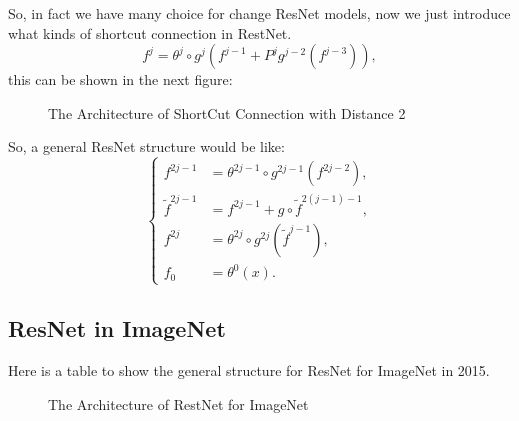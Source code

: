 So, in fact we have many choice for change ResNet models, now we just introduce what kinds of shortcut connection in  RestNet. 
\begin{equation}
f^j = \theta^j \circ g^j(f^{j-1} + P^jg^{j-2}(f^{j-3}) ),
\end{equation}
this can be shown in the next figure:
\begin{figure}[!htb]
	\caption{The Architecture of ShortCut Connection with Distance 2}      
	\label{LeNet-5}
\end{figure}
So, a general ResNet structure would be like:
\begin{equation}
\begin{cases}
f^{2j-1} &= \theta^{2j-1} \circ g^{2j-1}(f^{2j-2}), \\
\tilde f^{2j-1} &= f^{2j-1} + g\circ \tilde f^{2(j-1)-1}, \\
f^{2j} &= \theta^{2j} \circ g^{2j}(\tilde f^{j-1}),  \\
f_0 &= \theta^0(x).
\end{cases}
\end{equation}



\subsection{ResNet in ImageNet}
Here is a table to show the general structure for ResNet for ImageNet in 2015.
\begin{figure}[!htb]
	\caption{The Architecture of RestNet for ImageNet}      
	\label{LeNet-5}
\end{figure}

